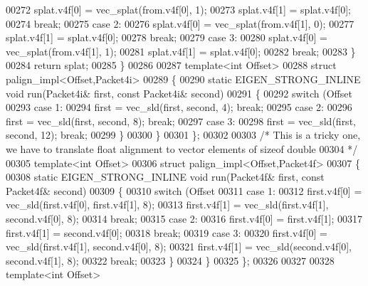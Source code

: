 \begin{DoxyCode}
{00272     splat.v4f[0] = vec\_splat(from.v4f[0], 1);
00273     splat.v4f[1] = splat.v4f[0];
00274     \textcolor{keywordflow}{break};
00275   \textcolor{keywordflow}{case} 2:
00276     splat.v4f[0] = vec\_splat(from.v4f[1], 0);
00277     splat.v4f[1] = splat.v4f[0];
00278     \textcolor{keywordflow}{break};
00279   \textcolor{keywordflow}{case} 3:
00280     splat.v4f[0] = vec\_splat(from.v4f[1], 1);
00281     splat.v4f[1] = splat.v4f[0];
00282     \textcolor{keywordflow}{break};
00283   \}
00284   \textcolor{keywordflow}{return} splat;
00285 \}
00286 
00287 \textcolor{keyword}{template}<\textcolor{keywordtype}{int} Offset>
00288 \textcolor{keyword}{struct }palign\_impl<Offset,Packet4i>
00289 \{
00290   \textcolor{keyword}{static} EIGEN\_STRONG\_INLINE \textcolor{keywordtype}{void} run(Packet4i& first, \textcolor{keyword}{const} Packet4i& second)
00291   \{
00292     \textcolor{keywordflow}{switch} (Offset %
00293     \textcolor{keywordflow}{case} 1:
00294       first = vec\_sld(first, second, 4); \textcolor{keywordflow}{break};
00295     \textcolor{keywordflow}{case} 2:
00296       first = vec\_sld(first, second, 8); \textcolor{keywordflow}{break};
00297     \textcolor{keywordflow}{case} 3:
00298       first = vec\_sld(first, second, 12); \textcolor{keywordflow}{break};
00299     \}
00300   \}
00301 \};
00302 
00303 \textcolor{comment}{/* This is a tricky one, we have to translate float alignment to vector elements of sizeof double}
00304 \textcolor{comment}{ */}
00305 \textcolor{keyword}{template}<\textcolor{keywordtype}{int} Offset>
00306 \textcolor{keyword}{struct }palign\_impl<Offset,Packet4f>
00307 \{
00308   \textcolor{keyword}{static} EIGEN\_STRONG\_INLINE \textcolor{keywordtype}{void} run(Packet4f& first, \textcolor{keyword}{const} Packet4f& second)
00309   \{
00310     \textcolor{keywordflow}{switch} (Offset %
00311     \textcolor{keywordflow}{case} 1:
00312       first.v4f[0] = vec\_sld(first.v4f[0], first.v4f[1], 8);
00313       first.v4f[1] = vec\_sld(first.v4f[1], second.v4f[0], 8);
00314       \textcolor{keywordflow}{break};
00315     \textcolor{keywordflow}{case} 2:
00316       first.v4f[0] = first.v4f[1];
00317       first.v4f[1] = second.v4f[0];
00318       \textcolor{keywordflow}{break};
00319     \textcolor{keywordflow}{case} 3:
00320       first.v4f[0] = vec\_sld(first.v4f[1],  second.v4f[0], 8);
00321       first.v4f[1] = vec\_sld(second.v4f[0], second.v4f[1], 8);
00322       \textcolor{keywordflow}{break};
00323     \}
00324   \}
00325 \};
00326 
00327 
00328 \textcolor{keyword}{template}<\textcolor{keywordtype}{int} Offset>
}
\end{DoxyCode}

